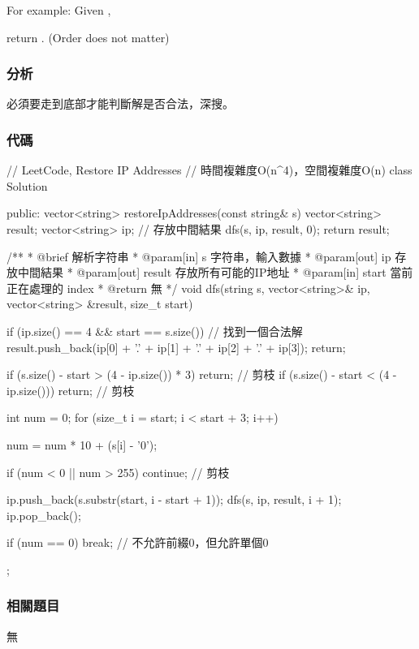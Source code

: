 For example:
Given ,

return \code{["255.255.11.135", "255.255.111.35"]}. (Order does not matter)


\subsubsection{分析}
必須要走到底部才能判斷解是否合法，深搜。


\subsubsection{代碼}
\begin{Code}
// LeetCode, Restore IP Addresses
// 時間複雜度O(n^4)，空間複雜度O(n)
class Solution {
public:
    vector<string> restoreIpAddresses(const string& s) {
        vector<string> result;
        vector<string> ip; // 存放中間結果
        dfs(s, ip, result, 0);
        return result;
    }

    /**
     * @brief 解析字符串
     * @param[in] s 字符串，輸入數據
     * @param[out] ip 存放中間結果
     * @param[out] result 存放所有可能的IP地址
     * @param[in] start 當前正在處理的 index
     * @return 無
     */
    void dfs(string s, vector<string>& ip, vector<string> &result,
            size_t start) {
        if (ip.size() == 4 && start == s.size()) {  // 找到一個合法解
            result.push_back(ip[0] + '.' + ip[1] + '.' + ip[2] + '.' + ip[3]);
            return;
        }

        if (s.size() - start > (4 - ip.size()) * 3)
            return;  // 剪枝
        if (s.size() - start < (4 - ip.size()))
            return;  // 剪枝

        int num = 0;
        for (size_t i = start; i < start + 3; i++) {
            num = num * 10 + (s[i] - '0');

            if (num < 0 || num > 255) continue;  // 剪枝
            
            ip.push_back(s.substr(start, i - start + 1));
            dfs(s, ip, result, i + 1);
            ip.pop_back();
            
            if (num == 0) break;  // 不允許前綴0，但允許單個0
        }
    }
};
\end{Code}


\subsubsection{相關題目}
\begindot
\item 無
\myenddot



